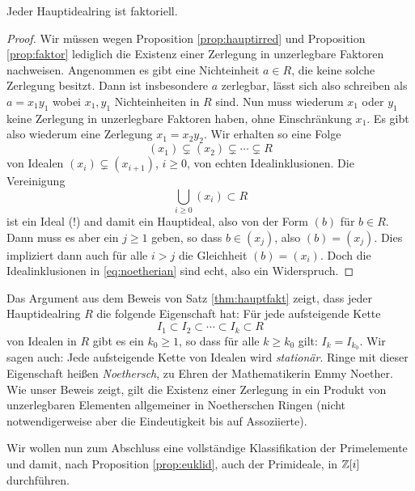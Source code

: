 \documentclass{book}
\begin{document}
\begin{thm}
    \label{thm:hauptfakt}
    Jeder Hauptidealring ist faktoriell.
\end{thm}
\begin{proof}
    Wir müssen wegen Proposition \ref{prop:hauptirred} und Proposition
    \ref{prop:faktor} lediglich die Existenz einer Zerlegung in unzerlegbare
    Faktoren nachweisen. Angenommen es gibt eine Nichteinheit $a \in R$, die
    keine solche Zerlegung besitzt. Dann ist insbesondere $a$ zerlegbar, lässt
    sich also schreiben als $a = x_1 y_1$ wobei $x_1,y_1$ Nichteinheiten in $R$
    sind. Nun muss wiederum $x_1$ oder $y_1$ keine Zerlegung in unzerlegbare
    Faktoren haben, ohne Einschränkung $x_1$. Es gibt also wiederum eine
    Zerlegung $x_1 = x_2 y _2$. Wir erhalten so eine Folge
    \begin{equation}
        \label{eq:noetherian}
        (x_1) \subsetneq (x_2) \subsetneq \cdots \subsetneq R
    \end{equation}
    von Idealen $(x_i) \subsetneq (x_{i+1})$, $i \ge 0$, von echten Idealinklusionen. Die Vereinigung 
    \[
        \bigcup_{i \ge 0} (x_i)  \subset R
    \]
    ist ein Ideal (!) and damit ein Hauptideal, also von der Form $(b)$ für $b \in
    R$. Dann muss es aber ein $j \ge 1$ geben, so dass $b \in (x_j)$, also $(b)
    = (x_j)$. Dies impliziert dann auch für alle $i >j$ die Gleichheit
    $(b) = (x_i)$. Doch die Idealinklusionen in \eqref{eq:noetherian} sind
    echt, also ein Widerspruch.
\end{proof}

\begin{rem}
    \label{rem:noether}
    Das Argument aus dem Beweis von Satz \ref{thm:hauptfakt} zeigt,
    dass jeder Hauptidealring $R$ die folgende Eigenschaft hat:
    Für jede aufsteigende Kette
    \[
        I_1 \subset I_2 \subset \cdots \subset I_k \subset  R
    \]
    von Idealen in $R$ gibt es ein $k_0 \ge 1$, so dass für alle $k \ge k_0$
    gilt: $I_k = I_{k_0}$. Wir sagen auch: Jede aufsteigende Kette von Idealen
    wird \emph{stationär}. Ringe mit dieser Eigenschaft heißen
    \emph{Noethersch}, zu Ehren der Mathematikerin Emmy Noether. Wie unser
    Beweis zeigt, gilt die Existenz einer Zerlegung in ein Produkt von unzerlegbaren
    Elementen allgemeiner in Noetherschen Ringen (nicht notwendigerweise aber
    die Eindeutigkeit bis auf Assoziierte). 
\end{rem}

Wir wollen nun zum Abschluss eine vollständige Klassifikation der Primelemente
und damit, nach Proposition \ref{prop:euklid}, auch der Primideale, in $\mathbb{Z}[i]$
durchführen.
\end{document}
